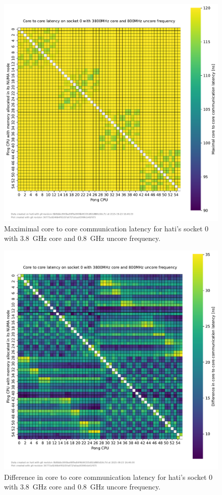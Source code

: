 \begin{figure}[]
    \centering
    \includegraphics[width=\columnwidth]{fig/core-to-core-latency/core-to-core-heatmap-max-3800-800.pdf}
    \caption{Maximimal core to core communication latency for hati's socket 0 with \SI{3.8}{\GHz} core and \SI{0.8}{\GHz} uncore frequency.}
\end{figure}
\begin{figure}[]
    \centering
    \includegraphics[width=\columnwidth]{fig/core-to-core-latency/core-to-core-heatmap-diff-3800-800.pdf}
    \caption{Difference in core to core communication latency for hati's socket 0 with \SI{3.8}{\GHz} core and \SI{0.8}{\GHz} uncore frequency.}
\end{figure}

